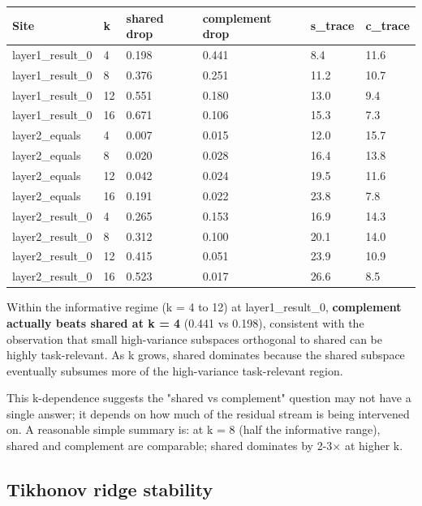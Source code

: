 \begin{center}
\begin{tabular}{|l|l|l|l|l|l|}
\hline
\textbf{Site} & \textbf{k} & \textbf{shared drop} & \textbf{complement drop} & \textbf{s\_trace} & \textbf{c\_trace} \\
\hline
layer1\_result\_0 & 4 & 0.198 & 0.441 & 8.4 & 11.6 \\
layer1\_result\_0 & 8 & 0.376 & 0.251 & 11.2 & 10.7 \\
layer1\_result\_0 & 12 & 0.551 & 0.180 & 13.0 & 9.4 \\
layer1\_result\_0 & 16 & 0.671 & 0.106 & 15.3 & 7.3 \\
layer2\_equals & 4 & 0.007 & 0.015 & 12.0 & 15.7 \\
layer2\_equals & 8 & 0.020 & 0.028 & 16.4 & 13.8 \\
layer2\_equals & 12 & 0.042 & 0.024 & 19.5 & 11.6 \\
layer2\_equals & 16 & 0.191 & 0.022 & 23.8 & 7.8 \\
layer2\_result\_0 & 4 & 0.265 & 0.153 & 16.9 & 14.3 \\
layer2\_result\_0 & 8 & 0.312 & 0.100 & 20.1 & 14.0 \\
layer2\_result\_0 & 12 & 0.415 & 0.051 & 23.9 & 10.9 \\
layer2\_result\_0 & 16 & 0.523 & 0.017 & 26.6 & 8.5 \\
\hline
\end{tabular}
\end{center}


Within the informative regime (k = 4 to 12) at layer1\_result\_0,
\textbf{complement actually beats shared at k = 4} (0.441 vs 0.198), consistent
with the observation that small high-variance subspaces orthogonal to
shared can be highly task-relevant. As k grows, shared dominates because
the shared subspace eventually subsumes more of the high-variance
task-relevant region.

This k-dependence suggests the "shared vs complement" question may not
have a single answer; it depends on how much of the residual stream is
being intervened on. A reasonable simple summary is: at k = 8 (half the
informative range), shared and complement are comparable; shared
dominates by 2-3$\times$ at higher k.

\subsection{Tikhonov ridge stability}

